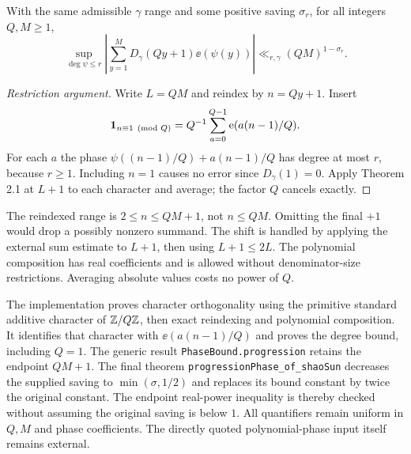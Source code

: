 \begin{lemma}\label{l:progression-phase}
\leanok
With the same admissible $\gamma$ range and some positive saving $\sigma_r$, for all integers $Q,M\geq1$,
\[
 \sup_{\deg\psi\leq r}
 \left|\sum_{y=1}^{M}D_\gamma(Qy+1)\ee(\psi(y))\right|
 \ll_{r,\gamma}(QM)^{1-\sigma_r}.
\]
\end{lemma}
\begin{proof}[Restriction argument]
\leanok
Write $L=QM$ and reindex by $n=Qy+1$. Insert
\[
 \mathbf 1_{n\equiv1\pmod Q}=Q^{-1}\sum_{a=0}^{Q-1}\mathrm e(a(n-1)/Q).
\]
For each $a$ the phase $\psi((n-1)/Q)+a(n-1)/Q$ has degree at most $r$, because $r\geq1$. Including $n=1$ causes no error since $D_\gamma(1)=0$. Apply Theorem 2.1 at $L+1$ to each character and average; the factor $Q$ cancels exactly.
\end{proof}
\ifDetailed
The reindexed range is $2\leq n\leq QM+1$, not $n\leq QM$. Omitting the final $+1$ would drop a possibly nonzero summand. The shift is handled by applying the external sum estimate to $L+1$, then using $L+1\leq2L$. The polynomial composition has real coefficients and is allowed without denominator-size restrictions. Averaging absolute values costs no power of $Q$.

The implementation proves character orthogonality using the primitive standard additive character of $\mathbb Z/Q\mathbb Z$, then exact reindexing and polynomial composition. It identifies that character with $\ee(a(n-1)/Q)$ and proves the degree bound, including $Q=1$. The generic result \texttt{PhaseBound.progression} retains the endpoint $QM+1$. The final theorem \texttt{progressionPhase\_\allowbreak{}of\_\allowbreak{}shaoSun} decreases the supplied saving to $\min(\sigma,1/2)$ and replaces its bound constant by twice the original constant. The endpoint real-power inequality is thereby checked without assuming the original saving is below $1$. All quantifiers remain uniform in $Q,M$ and phase coefficients. The directly quoted polynomial-phase input itself remains external.
\fi

